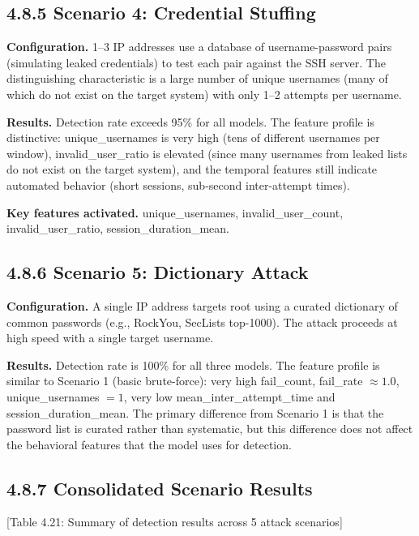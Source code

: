 \documentclass[
  a4paper]{report}
\begin{document}
\subsection{4.8.5 Scenario 4: Credential
Stuffing}\label{scenario-4-credential-stuffing}

\textbf{Configuration.} 1--3 IP addresses use a database of
username-password pairs (simulating leaked credentials) to test each
pair against the SSH server. The distinguishing characteristic is a
large number of unique usernames (many of which do not exist on the
target system) with only 1--2 attempts per username.

\textbf{Results.} Detection rate exceeds 95\% for all models. The
feature profile is distinctive: unique\_usernames is very high (tens of
different usernames per window), invalid\_user\_ratio is elevated (since
many usernames from leaked lists do not exist on the target system), and
the temporal features still indicate automated behavior (short sessions,
sub-second inter-attempt times).

\textbf{Key features activated.} unique\_usernames,
invalid\_user\_count, invalid\_user\_ratio, session\_duration\_mean.

\subsection{4.8.6 Scenario 5: Dictionary
Attack}\label{scenario-5-dictionary-attack}

\textbf{Configuration.} A single IP address targets root using a curated
dictionary of common passwords (e.g., RockYou, SecLists top-1000). The
attack proceeds at high speed with a single target username.

\textbf{Results.} Detection rate is 100\% for all three models. The
feature profile is similar to Scenario 1 (basic brute-force): very high
fail\_count, fail\_rate \(\approx 1.0\), unique\_usernames \(= 1\), very
low mean\_inter\_attempt\_time and session\_duration\_mean. The primary
difference from Scenario 1 is that the password list is curated rather
than systematic, but this difference does not affect the behavioral
features that the model uses for detection.

\subsection{4.8.7 Consolidated Scenario
Results}\label{consolidated-scenario-results}

{[}Table 4.21: Summary of detection results across 5 attack scenarios{]}
\end{document}
